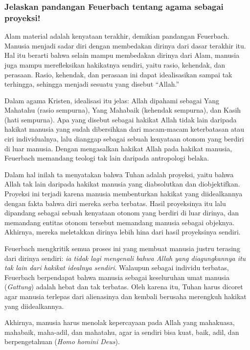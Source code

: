 \documentclass[11pt,twoside,a5paper,openany]{memoir}
\begin{document}
\hypertarget{jelaskan-pandangan-feuerbach-tentang-agama-sebagai-proyeksi}{%
\subsubsection{Jelaskan pandangan Feuerbach tentang agama sebagai
proyeksi!}\label{jelaskan-pandangan-feuerbach-tentang-agama-sebagai-proyeksi}}

Alam material adalah kenyataan terakhir, demikian pandangan Feuerbach.
Manusia menjadi sadar diri dengan membedakan dirinya dari dasar terakhir
itu. Hal itu berarti bahwa selain mampu membedakan dirinya dari Alam,
manusia juga mampu merefleksikan hakikatnya sendiri, yaitu rasio,
kehendak, dan perasaan. Rasio, kehendak, dan perasaan ini dapat
idealisasikan sampai tak terhingga, sehingga menjadi sesuatu yang
disebut ``Allah.''

Dalam agama Kristen, idealisasi itu jelas: Allah dipahami sebagai Yang
Mahatahu (rasio sempurna), Yang Mahabaik (kehendak sempurna), dan Kasih
(hati sempurna). Apa yang disebut sebagai hakikat Allah tidak lain
daripada hakikat manusia yang sudah dibersihkan dari macam-macam
keterbatasan atau ciri individualnya, lalu dianggap sebagai sebuah
kenyataan otonom yang berdiri di luar manusia. Dengan mengasalkan
hakikat Allah pada hakikat manusia, Feuerbach memandang teologi tak lain
daripada antropologi belaka.

Dalam hal inilah ta menyatakan bahwa Tuhan adalah proyeksi, yaitu bahwa
Allah tak lain daripada hakikat manusia yang diabsolutkan dan
diobjektifkan. Proyeksi ini terjadi karena manusia membenturkan hakikat
yang diidealkannya dengan fakta bahwa diri mereka serba terbatas. Hasil
proyeksinya itu lalu dipandang sebagai sebuah kenyataan otonom yang
berdiri di luar dirinya, dan memandang entitas otonom tersebut memandang
manusia sebagai objeknya. Akhirnya, mereka meletakkan dirinya lebih hina
dari hasil proyeksinya sendiri.

Feuerbach mengkritik semua proses ini yang membuat manusia justru
terasing dari dirinya sendiri: \emph{ia tidak lagi mengenali bahwa Allah
yang diagungkannya itu tak lain dari hakikat idealnya sendiri}. Walaupun
sebagai individu terbatas, Feuerbach berpendapat bahwa manusia sebagai
keseluruhan umat manusia (\emph{Gattung}) adalah hebat dan tak terbatas.
Oleh karena itu, Tuhan harus dicoret agar manusia terlepas dari
alienasinya dan kembali berusaha merengkuh hakikat yang diidealkannya.

Akhirnya, manusia harus menolak kepercayaan pada Allah yang mahakuasa,
mahabaik, maha-adil, dan mahatahu, agar ia sendiri bisa kuat, baik,
adil, dan berpengetahuan (\emph{Homo homini Deus}).
\end{document}
